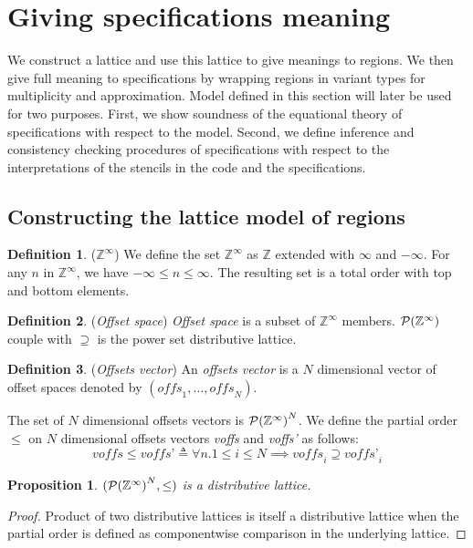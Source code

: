 \documentclass{article}
\theoremstyle{definition}
\newtheorem{defn}{Definition}
\theoremstyle{plain}
\newtheorem{prop}{Proposition}
\newcommand{\zinf}{\textnormal{$\mathbb{Z}^\infty$}}
\begin{document}
\section{Giving specifications meaning}

We construct a lattice and use this lattice to give meanings to regions. We
then give full meaning to specifications by wrapping regions in variant types
for multiplicity and approximation. Model defined in this section will later be
used for two purposes. First, we show soundness of the equational theory of
specifications with respect to the model. Second, we define inference and
consistency checking procedures of specifications with respect to the
interpretations of the stencils in the code and the specifications.

\subsection{Constructing the lattice model of regions}

\begin{defn}{(\zinf)}
  We define the set \zinf{} as $\mathbb{Z}$ extended with $\infty$ and
  $-\infty$. For any $n$ in \zinf{}, we have $-\infty \leq n \leq \infty$. The
  resulting set is a total order with top and bottom elements.
\end{defn}

\begin{defn}{(\emph{Offset space})}
  \emph{Offset space} is a subset of \zinf{} members. $\mathcal{P}(\zinf{})$
  couple with $\supseteq$ is the power set distributive lattice.
\end{defn}

\begin{defn}{(\emph{Offsets vector})}
  An \emph{offsets vector} is a $N$ dimensional vector of offset spaces denoted
  by $(\textit{offs}_1, \dots, \textit{offs}_N)$.

  The set of $N$ dimensional offsets vectors is $\mathcal{P}{(\zinf{})}^N$. We
  define the partial order $\leq$ on $N$ dimensional offsets vectors
  \textit{voffs} and \textit{voffs'} as follows:
%
  \begin{equation*}
    \textit{voffs} \leq \textit{voffs'} \triangleq
      \forall n. 1
        \leq i \leq N \implies \textit{voffs}_i \supseteq \textit{voffs'}_i
  \end{equation*}
\end{defn}

\begin{prop}{}
  $(\mathcal{P}{(\zinf{})}^N, \leq)$ is a distributive lattice.
\end{prop}
%
\begin{proof}
  Product of two distributive lattices is itself a distributive lattice when the
  partial order is defined as componentwise comparison in the underlying
  lattice.
\end{proof}
\end{document}
